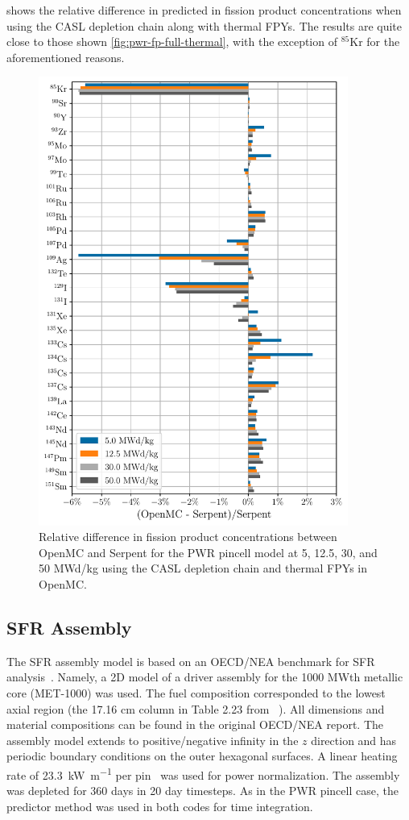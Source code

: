 \documentclass[3p,authoryear]{elsarticle}
\begin{document}
 shows the relative difference in predicted in
fission product concentrations when using the CASL depletion chain along with
thermal FPYs. The results are quite close to those shown
\cref{fig:pwr-fp-full-thermal}, with the exception of $^{85}$Kr for the
aforementioned reasons.
\begin{figure}[H]
  \centering
  \includegraphics[width=4in]{figures/pwr_fp_casl_thermal.pdf}
  \caption{Relative difference in fission product concentrations between OpenMC
  and Serpent for the PWR pincell model at 5, 12.5, 30, and 50 MWd/kg using the
  CASL depletion chain and thermal FPYs in OpenMC.}
  \label{fig:pwr-fp-casl-thermal}
\end{figure}

\subsection{SFR Assembly}

The SFR assembly model is based on an OECD/NEA benchmark for SFR
analysis~\citep{nsc2015}. Namely, a 2D model of a driver assembly for the 1000
MWth metallic core (MET-1000) was used. The fuel composition corresponded to the
lowest axial region (the 17.16 cm column in Table 2.23 from ~\citep{nsc2015}).
All dimensions and material compositions can be found in the original OECD/NEA
report. The assembly model extends to positive/negative infinity in the $z$
direction and has periodic boundary conditions on the outer hexagonal surfaces.
A linear heating rate of \SI{23.3}{\kilo\watt\per\meter} per
pin~\citep{cahalan2007anl} was used for power normalization. The assembly was
depleted for 360 days in 20 day timesteps. As in the PWR pincell case, the
predictor method was used in both codes for time integration.
\end{document}
